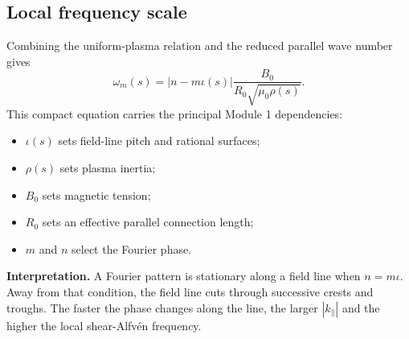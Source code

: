 \subsection{Local frequency scale}
Combining the uniform-plasma relation and the reduced parallel wave number gives
\begin{equation}
\boxed{
\omega_m(s)=|n-m\iota(s)|\frac{B_0}{R_0\sqrt{\mu_0\rho(s)}}.}
\label{eq:uncoupled_continuum_full}
\end{equation}
This compact equation carries the principal Module 1 dependencies:
\begin{itemize}[leftmargin=1.6em]
\item $\iota(s)$ sets field-line pitch and rational surfaces;
\item $\rho(s)$ sets plasma inertia;
\item $B_0$ sets magnetic tension;
\item $R_0$ sets an effective parallel connection length;
\item $m$ and $n$ select the Fourier phase.
\end{itemize}

\begin{physicsbox}
\textbf{Interpretation.} A Fourier pattern is stationary along a field line when $n=m\iota$. Away from that condition, the field line cuts through successive crests and troughs. The faster the phase changes along the line, the larger $|k_\parallel|$ and the higher the local shear-Alfv\'en frequency.
\end{physicsbox}

